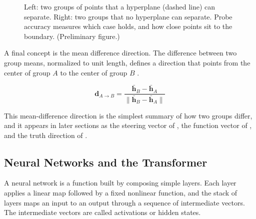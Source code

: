 \begin{figure}[htbp]
\centering
{}
\caption{Left: two groups of points that a hyperplane (dashed line) can separate. Right: two groups that no hyperplane can separate. Probe accuracy measures which case holds, and how close points sit to the boundary. (Preliminary figure.)}
\label{fig:separability}
\end{figure}

A final concept is the mean difference direction.
The difference between two group means, normalized to unit length, defines a direction that points from the center of group $A$ to the center of group $B$ \cite[p.~3]{wu2026linearly}.

\begin{equation}
\mathbf{d}_{A \to B} = \frac{\bar{\mathbf{h}}_B - \bar{\mathbf{h}}_A}{\lVert \bar{\mathbf{h}}_B - \bar{\mathbf{h}}_A \rVert}
\label{eq:meandiff}
\end{equation}

This mean-difference direction is the simplest summary of how two groups differ, and it appears in later sections as the steering vector of \textcite{wu2026linearly}, the function vector of \textcite{todd2024function}, and the truth direction of \textcite{marks2024geometry}.

\subsection{Neural Networks and the Transformer}
\label{sec:transformer}

A neural network is a function built by composing simple layers.
Each layer applies a linear map followed by a fixed nonlinear function, and the stack of layers maps an input to an output through a sequence of intermediate vectors.
The intermediate vectors are called activations or hidden states.
\\

